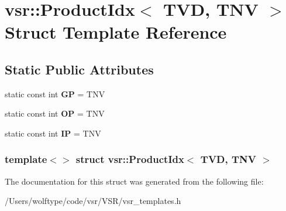 \hypertarget{structvsr_1_1_product_idx_3_01_t_v_d_00_01_t_n_v_01_4}{\section{vsr\-:\-:Product\-Idx$<$ T\-V\-D, T\-N\-V $>$ Struct Template Reference}
\label{structvsr_1_1_product_idx_3_01_t_v_d_00_01_t_n_v_01_4}
}
\subsection*{Static Public Attributes}
\begin{DoxyCompactItemize}
\item 
\hypertarget{structvsr_1_1_product_idx_3_01_t_v_d_00_01_t_n_v_01_4_a1aaf6528e60e9ab181822a1e638ea600}{static const int {\bfseries G\-P} = T\-N\-V}\label{structvsr_1_1_product_idx_3_01_t_v_d_00_01_t_n_v_01_4_a1aaf6528e60e9ab181822a1e638ea600}

\item 
\hypertarget{structvsr_1_1_product_idx_3_01_t_v_d_00_01_t_n_v_01_4_a535f9cc30e56603b3068e92f34b3c453}{static const int {\bfseries O\-P} = T\-N\-V}\label{structvsr_1_1_product_idx_3_01_t_v_d_00_01_t_n_v_01_4_a535f9cc30e56603b3068e92f34b3c453}

\item 
\hypertarget{structvsr_1_1_product_idx_3_01_t_v_d_00_01_t_n_v_01_4_a4570407c93c6b719fd0e107433891c94}{static const int {\bfseries I\-P} = T\-N\-V}\label{structvsr_1_1_product_idx_3_01_t_v_d_00_01_t_n_v_01_4_a4570407c93c6b719fd0e107433891c94}

\end{DoxyCompactItemize}
\subsubsection*{template$<$$>$ struct vsr\-::\-Product\-Idx$<$ T\-V\-D, T\-N\-V $>$}



The documentation for this struct was generated from the following file\-:\begin{DoxyCompactItemize}
\item 
/\-Users/wolftype/code/vsr/\-V\-S\-R/vsr\-\_\-templates.\-h\end{DoxyCompactItemize}
